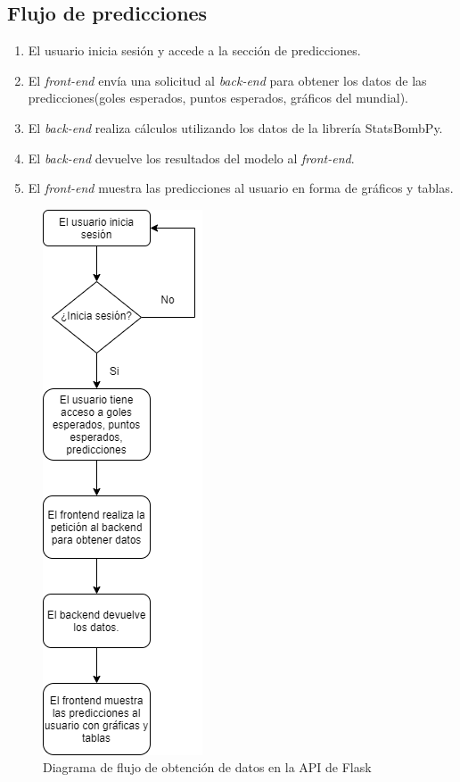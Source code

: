 \subsection{Flujo de predicciones}
\begin{enumerate}
	\item El usuario inicia sesión y accede a la sección de predicciones.
	\item El \textit{front-end} envía una solicitud al \textit{back-end} para obtener los datos de las predicciones(goles esperados, puntos esperados, gráficos del mundial).
        \item El \textit{back-end} realiza cálculos utilizando los datos de la librería StatsBombPy.
        \item El \textit{back-end} devuelve los resultados del modelo al \textit{front-end}.
        \item El \textit{front-end} muestra las predicciones al usuario en forma de gráficos y tablas.
\end{enumerate}
\begin{figure}[H]
    \centering
    \includegraphics[width=0.3\linewidth]{img/flujo3.png}
    \caption{Diagrama de flujo de obtención de datos en la API de Flask}
    \label{fig:enter-label}
\end{figure}

